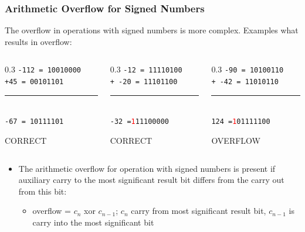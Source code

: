 \documentclass{beamer}
\begin{document}
\begin{frame}
\frametitle{Arithmetic Overflow for Signed Numbers}

The overflow in operations with signed numbers is more complex. Examples what results in overflow:
\bigskip
\begin{columns}
\begin{column}{0.3\textwidth}
\texttt{-112 = 10010000}\\
\texttt{+\phantom{x}45 = 00101101}\\
\vspace{-8pt}
\rule[0pt]{3cm}{0.1pt}\\
\texttt{\phantom{x}-67 = 10111101}\\
\begin{center}
\large CORRECT
\end{center}
\end{column}
\hfill
\begin{column}{0.3\textwidth}
\texttt{\phantom{xx}-12 = 11110100}\\
\texttt{+ -20 = 11101100}\\
\vspace{-8pt}
\rule[0pt]{3cm}{0.1pt}\\
\texttt{\phantom{xx}-32 =\textcolor{red}{1}11100000}\\
\begin{center}
\large CORRECT
\end{center}
\end{column}
\hfill
\begin{column}{0.3\textwidth}
\texttt{\phantom{xx}-90 = 10100110}\\
\texttt{+ -42 = 11010110}\\
\vspace{-8pt}
\rule[0pt]{3cm}{0.1pt}\\
\texttt{\phantom{xx}124 =\textcolor{red}{1}01111100}\\
\begin{center}
\large OVERFLOW
\end{center}
\end{column}
\end{columns}
\bigskip
\begin{itemize}
\item The arithmetic overflow for operation with signed numbers is present if auxiliary carry to the most significant result bit differs from the carry out from this bit:
\begin{itemize}
\item overflow = $c_n$ xor $c_{n-1}$; $c_n$ carry from most significant result bit, $c_{n-1}$ is carry into the most significant bit

\end{itemize}
\end{itemize}
\end{frame}
\end{document}
